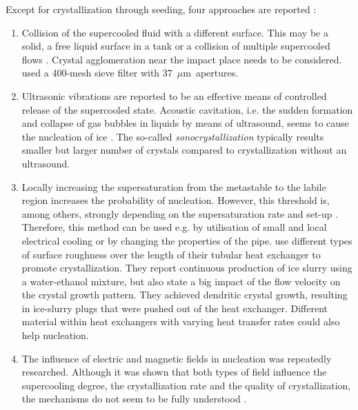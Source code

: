 \noindent Except for crystallization through seeding, four approaches are reported \citep{wang_investigation_2016, zhang_overview_2012}:

\begin{enumerate}
  \item Collision of the supercooled fluid with a different surface. This may be a solid, a free liquid surface in a tank or a collision of multiple supercooled flows \citep{bedecarrats_ice_2010}. Crystal agglomeration near the impact place needs to be considered. \cite{wang_investigation_2016} used a 400-mesh sieve filter with \SI{37}{$\mu$m} apertures.  
  \item Ultrasonic vibrations are reported to be an effective means of controlled release of the supercooled state. Acoustic cavitation, i.e. the sudden formation and collapse of gas bubbles in liquids by means of ultrasound, seems to cause the nucleation of ice \citep{baillon_28_2015}. The so-called \emph{sonocrystallization} typically results smaller but larger number of crystals compared to crystallization without an ultrasound. 
  \item Locally increasing the supersaturation from the metastable to the labile region increases the probability of nucleation. However, this threshold is, among others, strongly depending on the supersaturation rate and set-up \citep{mullin_crystallization_2001}. Therefore, this method can be used e.g. by utilisation of small and local electrical cooling or by changing the properties of the pipe. \cite{le_bail_ice_2015} use different types of surface roughness over the length of their tubular heat exchanger to promote crystallization. They report continuous production of ice slurry using a water-ethanol mixture, but also state a big impact of the flow velocity on the crystal growth pattern. They achieved dendritic crystal growth, resulting in ice-slurry plugs that were pushed out of the heat exchanger. Different material within heat exchangers with varying heat transfer rates could also help nucleation.
  \item The influence of electric and magnetic fields in nucleation was repeatedly researched. Although it was shown that both types of field influence the supercooling degree, the crystallization rate and the quality of crystallization, the mechanisms do not seem to be fully understood \citep{dalvi-isfahan_review_2017}.
\end{enumerate}



